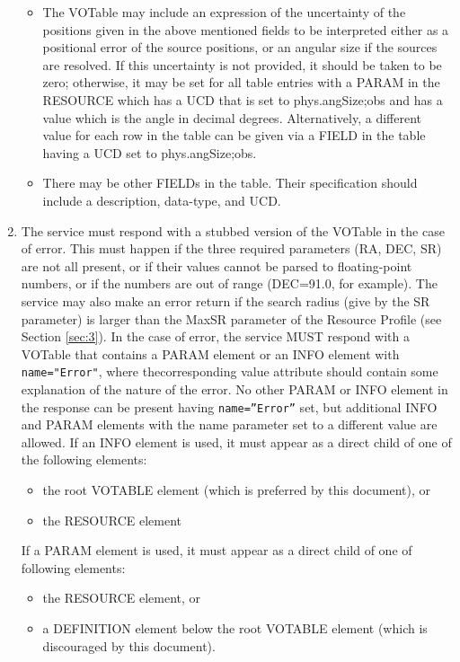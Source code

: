 \documentclass[11pt,a4paper]{ivoa}
\begin{document}
\begin{enumerate}
\begin{itemize}
			\item The VOTable may include an expression of the
				uncertainty of the positions given in the above mentioned fields to be
				interpreted either as a positional error of the source positions, or an
				angular size if the sources are resolved. If this uncertainty is not
				provided, it should be taken to be zero; otherwise, it may be set for
				all table entries with a PARAM in the RESOURCE which has a UCD that is
				set to phys.angSize;obs and has a value which is the angle in decimal
				degrees. Alternatively, a different value for each row in the table can
				be given via a FIELD in the table having a UCD set to phys.angSize;obs.
			\item There may be other FIELDs in the table. Their specification should
				include a description, data-type, and UCD.
		\end{itemize}
		
	\item The service must respond with a stubbed version of the VOTable in the case
		of error. This must happen if the three required parameters (RA, DEC,
		SR) are not all present, or if their values cannot be parsed to
		floating-point numbers, or if the numbers are out of range (DEC=91.0,
		for example). The service may also make an error return if the search
		radius (give by the SR parameter) is larger than the MaxSR parameter of
		the Resource Profile (see Section \ref{sec:3}). In the case of error,
		the service MUST respond with a VOTable that contains a PARAM element or
		an INFO element with \texttt{name="Error"}, where thecorresponding value
		attribute should contain some explanation of the nature of the error. No
		other PARAM or INFO element in the response can be present having
		\texttt{name=''Error''} set, but additional INFO and PARAM elements with
		the name parameter set to a different value are allowed. If an INFO
		element is used, it must appear as a direct child of one of the
		following elements:
		
		\begin{itemize} 
			\item the root VOTABLE element	(which is preferred by this document), or
			\item the RESOURCE element
		\end{itemize}
		
		If a PARAM element is used, it must appear as a direct
		child of one of following elements:
		
		\begin{itemize}
			\item the RESOURCE element, or
			\item a DEFINITION element below the root VOTABLE element
				(which is discouraged by this document).
		\end{itemize}


\end{enumerate}
\end{document}
